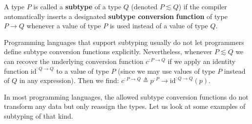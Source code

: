 A type $P$ is called a \textbf{subtype}
of a type $Q$ (denoted $P\lesssim Q$) if the compiler automatically
inserts a designated
\textbf{subtype conversion} \textbf{function} of type $P\rightarrow Q$
whenever a value of type $P$ is used instead of a value of type $Q$. 

Programming languages that support subtyping usually do not let programmers
define subtype conversion functions explicitly. Nevertheless, whenever
$P\lesssim Q$ we can recover the underlying conversion function $c^{:P\rightarrow Q}$
if we apply an identity function $\text{id}^{:Q\rightarrow Q}$ to
a value of type $P$ (since we may use values of type $P$ instead
of $Q$ in any expression). Then we find: $c^{:P\rightarrow Q}\triangleq p^{:P}\rightarrow\text{id}^{:Q\rightarrow Q}(p)$.

In most programming languages, the allowed subtype conversion functions
do not transform any data but only reassign the types. Let us look
at some examples of subtyping of that kind. 

